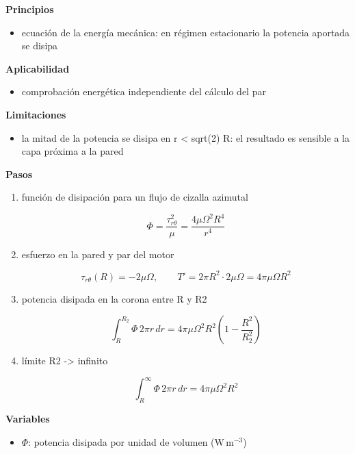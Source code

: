 \documentclass[10pt,openany]{book}
\begin{document}
\begin{tcolorbox}[title={Desarrollos del modelo}, studiumdef, breakable]
\noindent\textbf{Principios}
\begin{itemize}
\item ecuación de la energía mecánica: en régimen estacionario la potencia aportada se disipa
\end{itemize}

\noindent\textbf{Aplicabilidad}
\begin{itemize}
\item comprobación energética independiente del cálculo del par
\end{itemize}

\noindent\textbf{Limitaciones}
\begin{itemize}
\item la mitad de la potencia se disipa en r < sqrt(2) R: el resultado es sensible a la capa próxima a la pared
\end{itemize}

\noindent\textbf{Pasos}
\begin{enumerate}
\item
función de disipación para un flujo de cizalla azimutal

\[
\Phi = \frac{\tau_{r\theta}^{2}}{\mu} = \frac{4\mu\Omega^{2}R^{4}}{r^{4}}
\]
\item
esfuerzo en la pared y par del motor

\[
\tau_{r\theta}(R) = -2\mu\Omega,\qquad T' = 2\pi R^{2}\cdot 2\mu\Omega = 4\pi\mu\Omega R^{2}
\]
\item
potencia disipada en la corona entre R y R2

\[
\int_R^{R_2}\Phi\,2\pi r\,dr = 4\pi\mu\Omega^{2}R^{2}\left(1 - \frac{R^{2}}{R_2^{2}}\right)
\]
\item
límite R2 -> infinito

\[
\int_R^{\infty}\Phi\,2\pi r\,dr = 4\pi\mu\Omega^{2}R^{2}
\]
\end{enumerate}

\noindent\textbf{Variables}
\begin{itemize}
\item $\Phi$: potencia disipada por unidad de volumen ($\mathrm{W}\,\mathrm{m}^{-3}$)
\end{itemize}


\end{tcolorbox}
\end{document}
